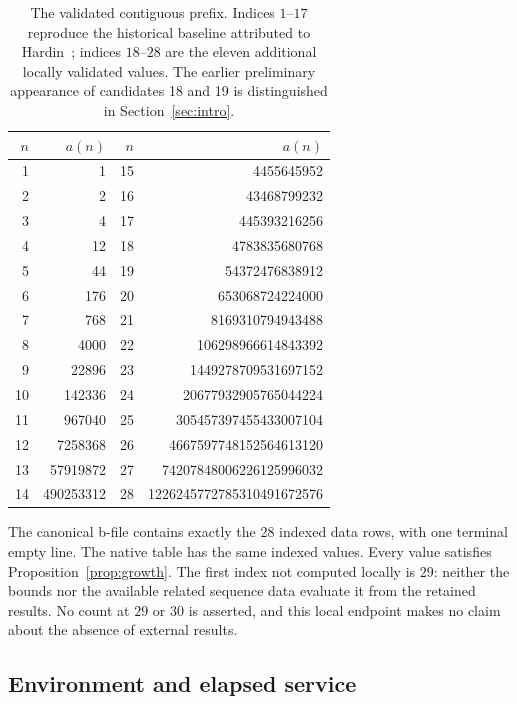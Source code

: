 \documentclass[11pt]{article}
\theoremstyle{definition}
\theoremstyle{remark}
\begin{document}
\begin{table}[htbp]
\centering\small
\begin{tabular}{@{}rr@{\qquad}rr@{}}
\toprule
$n$ & $a(n)$ & $n$ & $a(n)$ \\
\midrule
1 & 1 & 15 & 4455645952 \\
2 & 2 & 16 & 43468799232 \\
3 & 4 & 17 & 445393216256 \\
4 & 12 & 18 & 4783835680768 \\
5 & 44 & 19 & 54372476838912 \\
6 & 176 & 20 & 653068724224000 \\
7 & 768 & 21 & 8169310794943488 \\
8 & 4000 & 22 & 106298966614843392 \\
9 & 22896 & 23 & 1449278709531697152 \\
10 & 142336 & 24 & 20677932905765044224 \\
11 & 967040 & 25 & 305457397455433007104 \\
12 & 7258368 & 26 & 4667597748152564613120 \\
13 & 57919872 & 27 & 74207848006226125996032 \\
14 & 490253312 & 28 & 1226245772785310491672576 \\
\bottomrule
\end{tabular}
\caption{The validated contiguous prefix. Indices $1$--$17$ reproduce the
historical baseline attributed to Hardin~\cite{hardin}; indices $18$--$28$
are the eleven additional locally validated values. The earlier preliminary
appearance of candidates 18 and 19 is distinguished in Section~\ref{sec:intro}.}
\label{tab:terms}
\end{table}

The canonical b-file contains exactly the 28 indexed data rows, with one
terminal empty line. The native table has the same indexed values.
Every value satisfies Proposition~\ref{prop:growth}. The first index not
computed locally is $29$: neither the bounds nor the available related
sequence data evaluate it from the retained results. No count at $29$ or
$30$ is asserted, and this local endpoint makes no claim about the
absence of external results.

\subsection{Environment and elapsed service}
\end{document}
